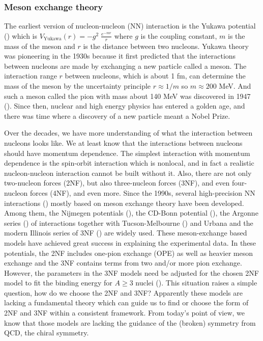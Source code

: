 \documentclass[12pt,letterpaper,UTF8]{report}
\begin{document}
\subsubsection{Meson exchange theory}

The earliest version of nucleon-nucleon (NN) interaction is the Yukawa potential (\cite{Yukawa1935}) which is
$V_{\text{Yukawa}}(r)= -g^2 \;\frac{e^{- mr}}{r}$ where $g$ is the coupling constant, $m$ is the mass of the meson and $r$ is the distance between two nucleons. Yukawa theory was pioneering in the 1930s because it first predicted that the interactions between nucleons are made by exchanging a new particle called a meson. The interaction range $r$ between nucleons, which is about 1 fm, can determine the mass of the meson by the uncertainty principle $r \approx 1/m$ so $m\approx 200$ MeV. And such a meson called the pion with mass about 140 MeV was discovered in 1947 (\cite{Meson1947a}). Since then, nuclear and high energy physics has entered a golden age, and there was time where a discovery of a new particle meant a Nobel Prize.

Over the decades, we have more understanding of what the interaction between nucleons looks like.
We at least know that the interactions between nucleons should have momentum dependence. The simplest interaction with momentum dependence is the spin-orbit interaction which is nonlocal, and in fact a realistic nucleon-nucleon interaction cannot be built without it.
Also, there are not only two-nucleon forces (2NF), but also three-nucleon forces (3NF), and even four-nucleon forces (4NF), and even more.
Since the 1990s, several high-precision NN interactions (\cite{Machleidt_2001}) mostly based on meson exchange theory have been developed.
Among them, the Nijmegen potentials (\cite{Stoks1994PRC}), the CD-Bonn potential (\cite{Machleidt1996PRC}), the Argonne series (\cite{Wiringa95PRC,WiringaPieper02a,Veerasamy2011PRC}) of interactions together with Tucson-Melbourne (\cite{Coon1981PRC}) and Urbana and the modern Illinois series of 3NF (\cite{CARLSON198359,WiringaPieper02a}) are widely used.
These meson-exchange based models have achieved great success in explaining the experimental data.
In these potentials, the 2NF includes one-pion exchange (OPE) as well as heavier meson exchange and the 3NF contains terms from two and/or more pion exchange.
However, the parameters in the 3NF models need be adjusted for the chosen 2NF model to fit the binding energy for $A\geq3$ nuclei (\cite{Nogga2000PRL}).
This situation raises a simple question, how do we choose the 2NF and 3NF? Apparently these models are lacking a fundamental theory which can guide us to find or choose the form of 2NF and 3NF within a consistent framework.
From today's point of view, we know that those models are lacking the guidance of the (broken) symmetry from QCD, the chiral symmetry.
\end{document}
